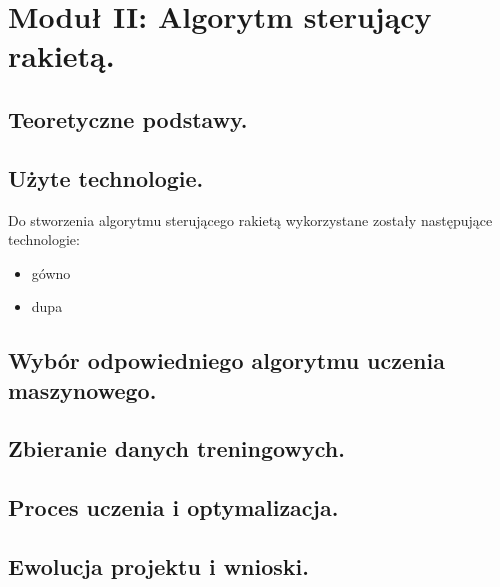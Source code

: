 \chapter{Moduł II: Algorytm sterujący rakietą.}

\section{Teoretyczne podstawy.}

\section{Użyte technologie.}
Do stworzenia algorytmu sterującego rakietą wykorzystane zostały następujące technologie:

\begin{itemize}
    \item gówno
    \item dupa
\end{itemize}


\section{Wybór odpowiedniego algorytmu uczenia maszynowego.}
\section{Zbieranie danych treningowych.}
\section{Proces uczenia i optymalizacja.}
\section{Ewolucja projektu i wnioski.}